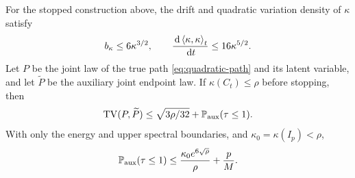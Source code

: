 \begin{lemma}
\label{lem:projection}
For the stopped construction above, the drift and quadratic variation density of $\kappa$ satisfy
\begin{equation}
 b_\kappa\le6\kappa^{3/2},\qquad
 \frac{\,\mathrm d\left\langle\kappa,\kappa\right\rangle_t}{\,\mathrm d t}\le16\kappa^{5/2}.
 \label{eq:kappa-generator}
\end{equation}
Let $P$ be the joint law of the true path \eqref{eq:quadratic-path} and its latent variable, and let $\widetilde P$ be the auxiliary joint endpoint law. If $\kappa(C_t)\le\rho$ before stopping, then
\begin{equation}
 \operatorname{TV}(P,\widetilde P)
 \le\sqrt{3\rho/32}+\mathbb P_{\mathrm{aux}}(\tau\le1).
 \label{eq:joint-projection}
\end{equation}
With only the energy and upper spectral boundaries, and
$\kappa_0=\kappa(I_p)<\rho$,
\begin{equation}
 \mathbb P_{\mathrm{aux}}(\tau\le1)
 \le\frac{\kappa_0e^{6\sqrt\rho}}{\rho}+\frac pM.
 \label{eq:projection-stop}
\end{equation}
\end{lemma}

